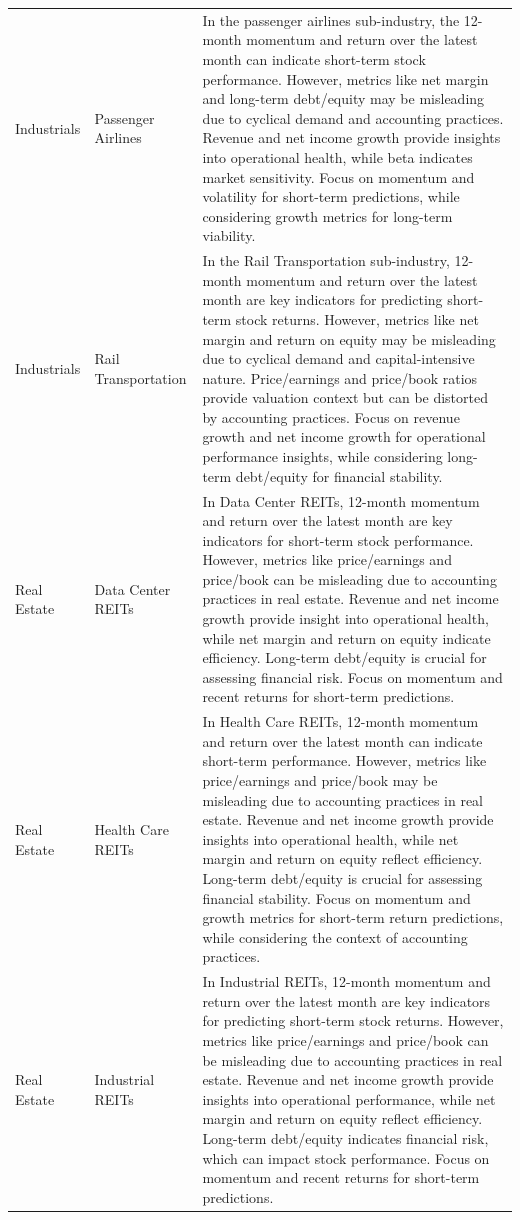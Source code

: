 \documentclass[xelatex,ja=standard,jafont=hiragino-pron,a4paper,10pt]{bxjsreport}
\begin{document}
{\begin{longtable}{p{1.90cm}p{2.90cm}p{9.60cm}}
Industrials & Passenger Airlines & In the passenger airlines sub-industry, the 12-month momentum and return over the latest month can indicate short-term stock performance. However, metrics like net margin and long-term debt/equity may be misleading due to cyclical demand and accounting practices. Revenue and net income growth provide insights into operational health, while beta indicates market sensitivity. Focus on momentum and volatility for short-term predictions, while considering growth metrics for long-term viability. \\
Industrials & Rail Transportation & In the Rail Transportation sub-industry, 12-month momentum and return over the latest month are key indicators for predicting short-term stock returns. However, metrics like net margin and return on equity may be misleading due to cyclical demand and capital-intensive nature. Price/earnings and price/book ratios provide valuation context but can be distorted by accounting practices. Focus on revenue growth and net income growth for operational performance insights, while considering long-term debt/equity for financial stability. \\
Real Estate & Data Center REITs & In Data Center REITs, 12-month momentum and return over the latest month are key indicators for short-term stock performance. However, metrics like price/earnings and price/book can be misleading due to accounting practices in real estate. Revenue and net income growth provide insight into operational health, while net margin and return on equity indicate efficiency. Long-term debt/equity is crucial for assessing financial risk. Focus on momentum and recent returns for short-term predictions. \\
Real Estate & Health Care REITs & In Health Care REITs, 12-month momentum and return over the latest month can indicate short-term performance. However, metrics like price/earnings and price/book may be misleading due to accounting practices in real estate. Revenue and net income growth provide insights into operational health, while net margin and return on equity reflect efficiency. Long-term debt/equity is crucial for assessing financial stability. Focus on momentum and growth metrics for short-term return predictions, while considering the context of accounting practices. \\
Real Estate & Industrial REITs & In Industrial REITs, 12-month momentum and return over the latest month are key indicators for predicting short-term stock returns. However, metrics like price/earnings and price/book can be misleading due to accounting practices in real estate. Revenue and net income growth provide insights into operational performance, while net margin and return on equity reflect efficiency. Long-term debt/equity indicates financial risk, which can impact stock performance. Focus on momentum and recent returns for short-term predictions. \\

\end{longtable}}
\end{document}
